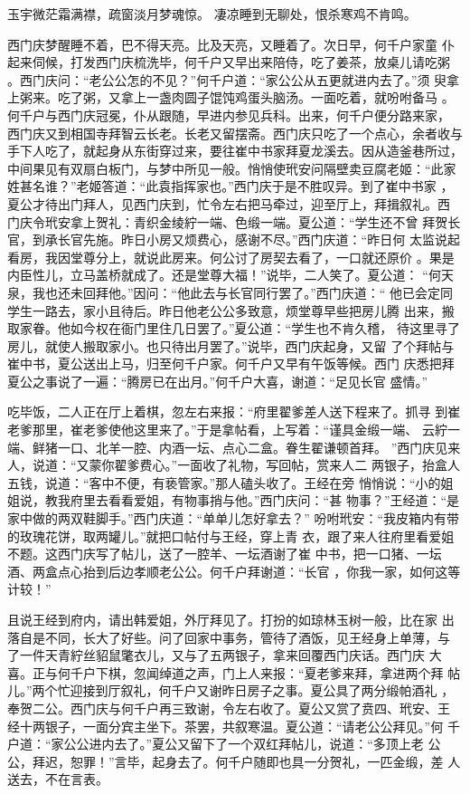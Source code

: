 玉宇微茫霜满襟，疏窗淡月梦魂惊。
凄凉睡到无聊处，恨杀寒鸡不肯鸣。

西门庆梦醒睡不着，巴不得天亮。比及天亮，又睡着了。次日早，何千户家童
仆起来伺候，打发西门庆梳洗毕，何千户又早出来陪侍，吃了姜茶，放桌儿请吃粥
。西门庆问：“老公公怎的不见？”何千户道：“家公公从五更就进内去了。”须
臾拿上粥来。吃了粥，又拿上一盏肉圆子馄饨鸡蛋头脑汤。一面吃着，就吩咐备马
。何千户与西门庆冠冕，仆从跟随，早进内参见兵科。出来，何千户便分路来家，
西门庆又到相国寺拜智云长老。长老又留摆斋。西门庆只吃了一个点心，余者收与
手下人吃了，就起身从东街穿过来，要往崔中书家拜夏龙溪去。因从造釜巷所过，
中间果见有双扇白板门，与梦中所见一般。悄悄使玳安问隔壁卖豆腐老姬：“此家
姓甚名谁？”老姬答道：“此袁指挥家也。”西门庆于是不胜叹异。到了崔中书家
，夏公才待出门拜人，见西门庆到，忙令左右把马牵过，迎至厅上，拜揖叙礼。西
门庆令玳安拿上贺礼：青织金绫紵一端、色缎一端。夏公道：“学生还不曾
拜贺长官，到承长官先施。昨日小房又烦费心，感谢不尽。”西门庆道：“昨日何
太监说起看房，我因堂尊分上，就说此房来。何公讨了房契去看了，一口就还原价
。果是内臣性儿，立马盖桥就成了。还是堂尊大福！”说毕，二人笑了。夏公道：
“何天泉，我也还未回拜他。”因问：“他此去与长官同行罢了。”西门庆道：“
他已会定同学生一路去，家小且待后。昨日他老公公多致意，烦堂尊早些把房儿腾
出来，搬取家眷。他如今权在衙门里住几日罢了。”夏公道：“学生也不肯久稽，
待这里寻了房儿，就使人搬取家小。也只待出月罢了。”说毕，西门庆起身，又留
了个拜帖与崔中书，夏公送出上马，归至何千户家。何千户又早有午饭等候。西门
庆悉把拜夏公之事说了一遍：“腾房已在出月。”何千户大喜，谢道：“足见长官
盛情。”

吃毕饭，二人正在厅上着棋，忽左右来报：“府里翟爹差人送下程来了。抓寻
到崔老爹那里，崔老爹使他这里来了。”于是拿帖看，上写着：“谨具金缎一端、
云紵一端、鲜猪一口、北羊一腔、内酒一坛、点心二盒。眷生翟谦顿首拜。
”西门庆见来人，说道：“又蒙你翟爹费心。”一面收了礼物，写回帖，赏来人二
两银子，抬盒人五钱，说道：“客中不便，有亵管家。”那人磕头收了。王经在旁
悄悄说：“小的姐姐说，教我府里去看看爱姐，有物事捎与他。”西门庆问：“甚
物事？”王经道：“是家中做的两双鞋脚手。”西门庆道：“单单儿怎好拿去？”
吩咐玳安：“我皮箱内有带的玫瑰花饼，取两罐儿。”就把口帖付与王经，穿上青
衣，跟了来人往府里看爱姐不题。这西门庆写了帖儿，送了一腔羊、一坛酒谢了崔
中书，把一口猪、一坛酒、两盒点心抬到后边孝顺老公公。何千户拜谢道：“长官
，你我一家，如何这等计较！”

且说王经到府内，请出韩爱姐，外厅拜见了。打扮的如琼林玉树一般，比在家
出落自是不同，长大了好些。问了回家中事务，管待了酒饭，见王经身上单薄，与
了一件天青紵丝貂鼠氅衣儿，又与了五两银子，拿来回覆西门庆话。西门庆
大喜。正与何千户下棋，忽闻绰道之声，门上人来报：“夏老爹来拜，拿进两个拜
帖儿。”两个忙迎接到厅叙礼，何千户又谢昨日房子之事。夏公具了两分缎帕酒礼
，奉贺二公。西门庆与何千户再三致谢，令左右收了。夏公又赏了贲四、玳安、王
经十两银子，一面分宾主坐下。茶罢，共叙寒温。夏公道：“请老公公拜见。”何
千户道：“家公公进内去了。”夏公又留下了一个双红拜帖儿，说道：“多顶上老
公公，拜迟，恕罪！”言毕，起身去了。何千户随即也具一分贺礼，一匹金缎，差
人送去，不在言表。


